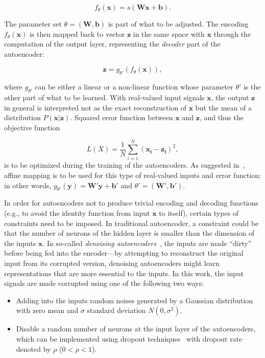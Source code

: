 \documentclass[12pt]{article}
\newcommand{\myvec}[1]{\mathbf{#1}}
\begin{document}
\[f_{\theta}(\myvec{x}) = s(\myvec{W}\myvec{x} + \myvec{b}).\]

The parameter set $\theta=(\myvec{W}, \myvec{b})$ is part of what to be adjusted. The encoding $f_{\theta}(\myvec{x})$ is then mapped back to vector $\myvec{z}$ in the same space with $\myvec{x}$ through the computation of the output layer, representing the \textit{decoder} part of the autoencoder:

\[\myvec{z} = g_{\theta'}(f_{\theta}(\myvec{x})),\]

\noindent
where $g_{\theta'}$ can be either a linear or a non-linear function whose parameter $\theta'$ is the other part of what to be learned. With real-valued input signals $\myvec{x}$, the output $\myvec{z}$ in general is interpreted not as the exact reconstruction of $\myvec{x}$ but the mean of a distribution $P(\myvec{x}|\myvec{z})$. Squared error function between $\myvec{x}$ and $\myvec{z}$, and thus the objective function

\[L(X) = \frac{1}{N}\sum_{i=1}^{N}(\myvec{x_i} - \myvec{z_i})^2,\]
\noindent
is to be optimized during the training of the autoencoders. As suggested in~\cite{vincent2010stacked}, affine mapping is to be used for this type of real-valued inputs and error function; in other words, $g_{\theta'}(\myvec{y}) = \myvec{W}' \myvec{y} + \myvec{b}'$ and $\theta'=(\myvec{W}', \myvec{b}')$.

In order for autoencoders not to produce trivial encoding and decoding functions (e.g., to avoid the identity function from input $\myvec{x}$ to itself), certain types of constraints need to be imposed. In traditional autoencoder, a constraint could be that the number of neurons of the hidden layer is smaller than the dimension of the inputs $\myvec{x}$. In so-called \textit{denoising autoencoders}~\cite{vincent2010stacked}, the inputs are made ``dirty'' before being fed into the encoder---by attempting to reconstruct the original input from its corrupted version, denoising autoencoders might learn representations that are more essential to the inputs. In this work, the input signals are made corrupted using one of the following two ways:
\begin{itemize}
\item Adding into the inputs random noises generated by a Gaussian distribution with zero mean and $\sigma$ standard deviation $N(0,\sigma^2)$.
\item Disable a random number of neurons at the input layer of the autoencoders, which can be implemented using dropout techniques~\cite{srivastava2014dropout} with dropout rate denoted by $\rho$ ($0 < \rho < 1$).
\end{itemize}
\end{document}

